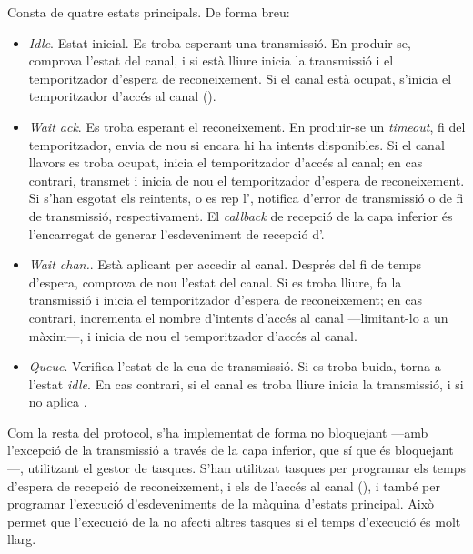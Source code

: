 \documentclass{tfgitic}[2024/07/01]
\begin{document}
Consta de quatre estats principals. De forma breu:
\begin{itemize}
    \item \emph{Idle}. Estat inicial. Es troba esperant una transmissió. En produir-se, comprova l'estat del canal, i si està lliure inicia la transmissió i el temporitzador d'espera de reconeixement. Si el canal està ocupat, s'inicia el temporitzador d'accés al canal ().
    \item \emph{Wait ack}. Es troba esperant el reconeixement. En produir-se un \emph{timeout}, fi del temporitzador, envia de nou si encara hi ha intents disponibles. Si el canal llavors es troba ocupat, inicia el temporitzador d'accés al canal; en cas contrari, transmet i inicia de nou el temporitzador d'espera de reconeixement. Si s'han esgotat els reintents, o es rep l', notifica d'error de transmissió o de fi de transmissió, respectivament. El \emph{callback} de recepció de la capa inferior és l'encarregat de generar l'esdeveniment de recepció d'.
    \item \emph{Wait chan.}. Està aplicant  per accedir al canal. Després del fi de temps d'espera, comprova de nou l'estat del canal. Si es troba lliure, fa la transmissió i inicia el temporitzador d'espera de reconeixement; en cas contrari, incrementa el nombre d'intents d'accés al canal ---limitant-lo a un màxim---, i inicia de nou el temporitzador d'accés al canal.
    \item \emph{Queue}. Verifica l'estat de la cua de transmissió. Si es troba buida, torna a l’estat \emph{idle}. En cas contrari, si el canal es troba lliure inicia la transmissió, i si no aplica .
\end{itemize}

Com la resta del protocol, s'ha implementat de forma no bloquejant ---amb l'excepció de la transmissió a través de la capa inferior, que sí que és bloquejant---, utilitzant el gestor de tasques. S’han utilitzat tasques per programar els temps d'espera de recepció de reconeixement, i els de l'accés al canal (), i també per programar l'execució d'esdeveniments de la màquina d'estats principal. Això permet que l'execució de la  no afecti altres tasques si el temps d'execució és molt llarg.
\end{document}
